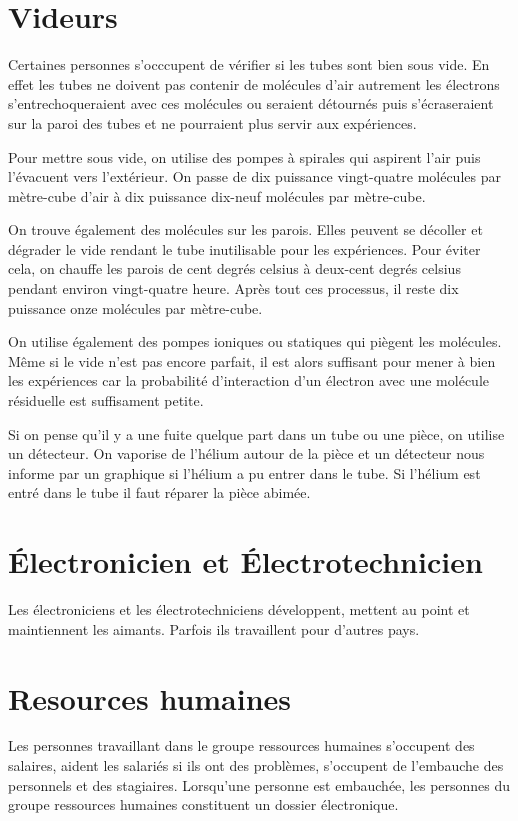 		\section{Videurs}
			 Certaines personnes s'occcupent de vérifier si les tubes sont bien sous vide. En effet les tubes ne doivent pas contenir de molécules d'air autrement les électrons s'entrechoqueraient avec ces molécules ou seraient détournés puis s'écraseraient sur la paroi des tubes et ne pourraient plus servir aux expériences.
			
			\par Pour mettre sous vide, on utilise des pompes à spirales qui aspirent l'air puis l'évacuent vers l'extérieur. On passe de dix puissance vingt-quatre molécules par mètre-cube d'air à dix puissance dix-neuf molécules par mètre-cube. 
			\par On trouve également des molécules sur les parois. Elles peuvent se décoller et dégrader le vide rendant le tube inutilisable pour les expériences. Pour éviter cela, on chauffe les parois de cent degrés celsius à deux-cent degrés celsius pendant environ vingt-quatre heure. Après tout ces processus, il reste dix puissance onze molécules par mètre-cube. 
			\par On utilise également des pompes ioniques ou statiques qui piègent les molécules. Même si le vide n'est pas encore parfait, il est alors suffisant pour mener à bien les expériences car la probabilité d'interaction d'un électron avec une molécule résiduelle est suffisament petite. 

			\par Si on pense qu'il y a une fuite quelque part dans un tube ou une pièce, on utilise un détecteur. On vaporise de l'hélium autour de la pièce et un détecteur nous informe par un graphique si l'hélium a pu entrer dans le tube. Si l'hélium est entré dans le tube il faut réparer la pièce abimée.  
		
		\section{Électronicien et Électrotechnicien}
			Les électroniciens et les électrotechniciens développent, mettent au point et maintiennent les aimants. Parfois ils travaillent pour d'autres pays.
		
		\section{Resources humaines}
			Les personnes travaillant dans le groupe ressources humaines s'occupent des salaires, aident les salariés si ils ont des problèmes, s'occupent de l'embauche des personnels et des stagiaires. Lorsqu'une personne est embauchée, les personnes du groupe ressources humaines constituent un dossier électronique. 

